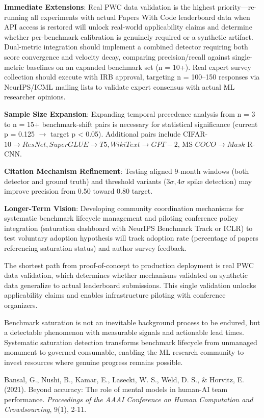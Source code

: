
\textbf{Immediate Extensions}: Real PWC data validation is the highest priority---re-running all experiments with actual Papers With Code leaderboard data when API access is restored will unlock real-world applicability claims and determine whether per-benchmark calibration is genuinely required or a synthetic artifact. Dual-metric integration should implement a combined detector requiring both score convergence and velocity decay, comparing precision/recall against single-metric baselines on an expanded benchmark set (n = 10+). Real expert survey collection should execute with IRB approval, targeting n = 100--150 responses via NeurIPS/ICML mailing lists to validate expert consensus with actual ML researcher opinions.

\textbf{Sample Size Expansion}: Expanding temporal precedence analysis from n = 3 to n = 15+ benchmark-shift pairs is necessary for statistical significance (current p = 0.125 $\rightarrow$ target p < 0.05). Additional pairs include CIFAR-$10\rightarrow ResNet, SuperGLUE\rightarrow T5, WikiText\rightarrow GPT-2$, MS $COCO\rightarrow Mask$ R-CNN.

\textbf{Citation Mechanism Refinement}: Testing aligned 9-month windows (both detector and ground truth) and threshold variants ($3\sigma, 4\sigma$ spike detection) may improve precision from 0.50 toward 0.80 target.

\textbf{Longer-Term Vision}: Developing community coordination mechanisms for systematic benchmark lifecycle management and piloting conference policy integration (saturation dashboard with NeurIPS Benchmark Track or ICLR) to test voluntary adoption hypothesis will track adoption rate (percentage of papers referencing saturation status) and author survey feedback.

The shortest path from proof-of-concept to production deployment is real PWC data validation, which determines whether mechanisms validated on synthetic data generalize to actual leaderboard submissions. This single validation unlocks applicability claims and enables infrastructure piloting with conference organizers.

Benchmark saturation is not an inevitable background process to be endured, but a detectable phenomenon with measurable signals and actionable lead times. Systematic saturation detection transforms benchmark lifecycle from unmanaged monument to governed consumable, enabling the ML research community to invest resources where genuine progress remains possible.


Bansal, G., Nushi, B., Kamar, E., Lasecki, W. S., Weld, D. S., \& Horvitz, E. (2021). Beyond accuracy: The role of mental models in human-AI team performance. \textit{Proceedings of the AAAI Conference on Human Computation and Crowdsourcing}, 9(1), 2-11.

